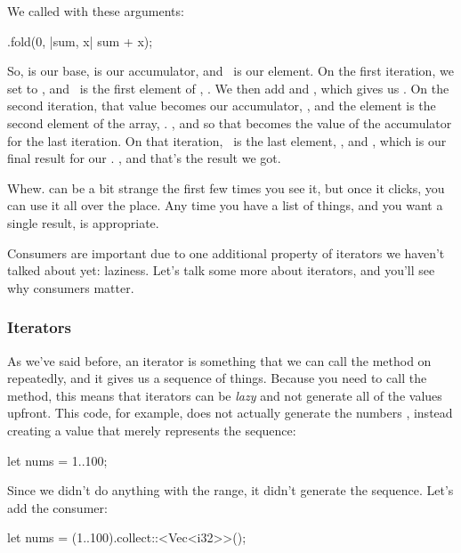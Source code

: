 We called  with these arguments:

\begin{rustc}
.fold(0, |sum, x| sum + x);
\end{rustc}

So,  is our base,  is our accumulator, and \x\ is our element. On the first iteration, we set  to , 
and \x\ is the first element of , . We then add  and \x, which gives us . On the second 
iteration, that value becomes our accumulator, , and the element is the second element of the array, . , 
and so that becomes the value of the accumulator for the last iteration. On that iteration, \x\ is the last element, , and 
, which is our final result for our . , and that's the result we got.

\blank

Whew.  can be a bit strange the first few times you see it, but once it clicks, you can use it all over the place. 
Any time you have a list of things, and you want a single result,  is appropriate.

\blank

Consumers are important due to one additional property of iterators we haven't talked about yet: laziness. Let's talk some more 
about iterators, and you'll see why consumers matter.

\subsubsection*{Iterators}

As we've said before, an iterator is something that we can call the  method on repeatedly, and it gives us a sequence 
of things. Because you need to call the method, this means that iterators can be \emph{lazy} and not generate all of the values upfront. 
This code, for example, does not actually generate the numbers , instead creating a value that merely represents the sequence:

\begin{rustc}
let nums = 1..100;
\end{rustc}

Since we didn't do anything with the range, it didn't generate the sequence. Let's add the consumer:

\begin{rustc}
let nums = (1..100).collect::<Vec<i32>>();
\end{rustc}

